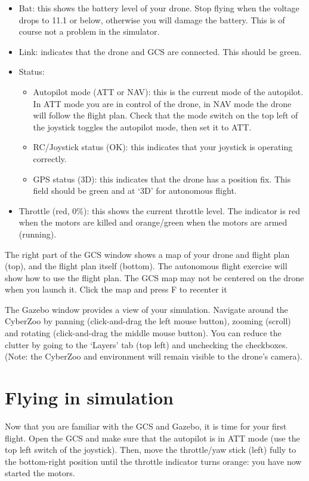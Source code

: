 \begin{itemize}
	\item Bat: this shows the battery level of your drone. Stop flying when the voltage drops to 11.1 or below, otherwise you will damage the battery. This is of course not a problem in the simulator.
	\item Link: indicates that the drone and GCS are connected. This should be green.
	\item Status:
	\begin{itemize}
		\item Autopilot mode (ATT or NAV): this is the current mode of the autopilot. In ATT mode you are in control of the drone, in NAV mode the drone will follow the flight plan. Check that the mode switch on the top left of the joystick toggles the autopilot mode, then set it to ATT.
		\item RC/Joystick status (OK): this indicates that your joystick is operating correctly.
		\item GPS status (3D): this indicates that the drone has a position fix. This field should be green and at `3D' for autonomous flight.
	\end{itemize}
	\item Throttle (red, 0\%): this shows the current throttle level. The indicator is red when the motors are killed and orange/green when the motors are armed (running).
\end{itemize}

The right part of the GCS window shows a map of your drone and flight plan (top), and the flight plan itself (bottom). The autonomous flight exercise will show how to use the flight plan. The GCS map may not be centered on the drone when you launch it. Click the map and press F to recenter it

The Gazebo window provides a view of your simulation. Navigate around the CyberZoo by panning (click-and-drag the left mouse button), zooming (scroll) and rotating (click-and-drag the middle mouse button).
You can reduce the clutter by going to the `Layers' tab (top left) and unchecking the checkboxes. (Note: the CyberZoo and environment will remain visible to the drone's camera).

\section{Flying in simulation}

Now that you are familiar with the GCS and Gazebo, it is time for your first flight.
Open the GCS and make sure that the autopilot is in ATT mode (use the top left switch of the joystick). Then, move the throttle/yaw stick (left) fully to the bottom-right position until the throttle indicator turns orange: you have now started the motors.

